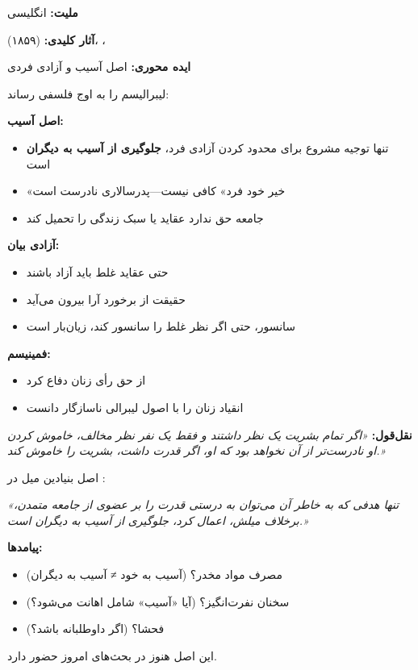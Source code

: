 \begin{personbox}

\textbf{ملیت:} انگلیسی

\textbf{آثار کلیدی:}  (۱۸۵۹)، ، 

\textbf{ایده محوری:} اصل آسیب و آزادی فردی

\mediumspace

 لیبرالیسم را به اوج فلسفی رساند:

\textbf{اصل آسیب:}
\begin{itemize}[nosep]
    \item تنها توجیه مشروع برای محدود کردن آزادی فرد، \textbf{جلوگیری از آسیب به دیگران} است
    \item «خیر خود فرد» کافی نیست—پدرسالاری نادرست است
    \item جامعه حق ندارد عقاید یا سبک زندگی را تحمیل کند
\end{itemize}

\textbf{آزادی بیان:}
\begin{itemize}[nosep]
    \item حتی عقاید غلط باید آزاد باشند
    \item حقیقت از برخورد آرا بیرون می‌آید
    \item سانسور، حتی اگر نظر غلط را سانسور کند، زیان‌بار است
\end{itemize}

\textbf{فمینیسم:}
\begin{itemize}[nosep]
    \item از حق رأی زنان دفاع کرد
    \item انقیاد زنان را با اصول لیبرالی ناسازگار دانست
\end{itemize}

\mediumspace

\textbf{نقل‌قول:} \textit{«اگر تمام بشریت یک نظر داشتند و فقط یک نفر نظر مخالف، خاموش کردن او نادرست‌تر از آن نخواهد بود که او، اگر قدرت داشت، بشریت را خاموش کند.»}
\end{personbox}

\begin{defbox}
اصل بنیادین میل در :

\textit{«تنها هدفی که به خاطر آن می‌توان به درستی قدرت را بر عضوی از جامعه متمدن، برخلاف میلش، اعمال کرد، جلوگیری از آسیب به دیگران است.»}

\textbf{پیامدها:}
\begin{itemize}[nosep]
    \item مصرف مواد مخدر؟ (آسیب به خود ≠ آسیب به دیگران)
    \item سخنان نفرت‌انگیز؟ (آیا «آسیب» شامل اهانت می‌شود؟)
    \item فحشا؟ (اگر داوطلبانه باشد؟)
\end{itemize}
این اصل هنوز در بحث‌های امروز حضور دارد.
\end{defbox}

